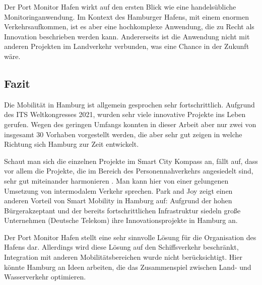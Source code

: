 Der Port Monitor Hafen wirkt auf den ersten Blick wie eine handelsübliche Monitoringanwendung.
Im Kontext des Hamburger Hafens, mit einem enormen Verkehrsaufkommen, ist es aber eine hochkomplexe Anwendung, die zu Recht als Innovation beschrieben werden kann.
Andererseits ist die Anwendung nicht mit anderen Projekten im Landverkehr verbunden, was eine Chance in der Zukunft wäre.

\subsection{Fazit}

Die Mobilität in Hamburg ist allgemein gesprochen sehr fortschrittlich. Aufgrund des ITS Weltkongresses 2021, wurden sehr viele innovative Projekte ins Leben gerufen.
Wegen des geringen Umfangs konnten in dieser Arbeit aber nur zwei von insgesamt 30 Vorhaben vorgestellt werden, die aber sehr gut zeigen in welche Richtung sich Hamburg zur Zeit entwickelt. 

Schaut man sich die einzelnen Projekte im Smart City Kompass an, fällt auf, dass vor allem die Projekte, die im Bereich des Personennahverkehrs angesiedelt sind, sehr gut miteinander harmonieren \autocite[vgl.][]{SmartCityKompass.2020d}.
Man kann hier von einer gelungenen Umsetzung von intermodalem Verkehr sprechen. Park and Joy zeigt einen anderen Vorteil von Smart Mobility in Hamburg auf: Aufgrund der hohen Bürgerakzeptant und der bereits fortschrittlichen Infrastruktur siedeln große Unternehmen (Deutsche Telekom) ihre Innovationsprojekte in Hamburg an.

Der Port Monitor Hafen stellt eine sehr sinnvolle Lösung für die Organisation des Hafens dar. Allerdings wird diese Lösung auf den Schiffsverkehr beschränkt, Integration mit anderen Mobilitätsbereichen wurde nicht berücksichtigt. Hier könnte Hamburg an Ideen arbeiten, die das Zusammenspiel zwischen Land- und Wasserverkehr optimieren.
